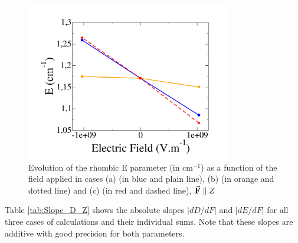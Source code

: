 \documentclass[12pt]{report}
\numberwithin{equation}{section}
\begin{document}
\begin{figure}[!ht]
    \centering
    \includegraphics[width=0.8\textwidth]{Images/E_E_Z.png}
	\caption[Evolution of the rhombic E parameter as a function of the field applied in cases (a), (b) and (c) for $\vec{\vb{F}}\parallel Z$]{Evolution of the rhombic E parameter (in cm$^{-1}$) as a function of the field applied in cases (a) (in blue and plain line), (b) (in orange and dotted line) and (c) (in red and dashed line), $\vec{\vb F}\parallel Z$}
    \label{fig:Ni_E_Z}
\end{figure}


Table \ref{tab:Slope_D_Z} shows the absolute slopes $|dD/dF|$ and $|dE/dF|$ for all three cases of calculations and their individual sums.
Note that these slopes are additive with good precision for both parameters.
\end{document}
